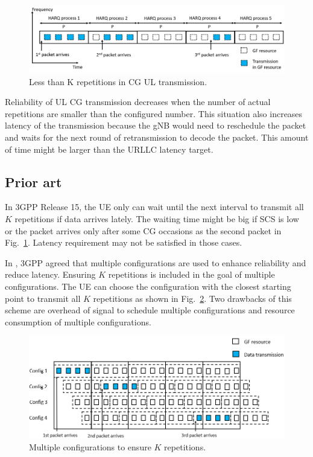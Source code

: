 \documentclass{ieeeaccess}
\begin{document}
\begin{figure}[htbp]
\centerline{\includegraphics[scale=0.27]{fig4.png}}
\caption{Less than K repetitions in CG UL transmission.}
\label{fig4}
\vspace{-3mm}
\end{figure}

Reliability of UL CG transmission decreases when the number of actual repetitions are smaller than the configured number. This situation also increases latency of the transmission because the gNB would need to reschedule the packet and waits for the next round of retransmission to decode the packet. This amount of time might be larger than the URLLC latency target.

\subsection{Prior art}\label{IIIBN}
In 3GPP Release 15, the UE only can wait until the next interval to transmit all $K$ repetitions if data arrives lately. The waiting time might be big if SCS is low or the packet arrives only after some CG occasions as the second packet in Fig.~\ref{fig4}. Latency requirement may not be satisfied in those cases.

In \cite{ref7}, 3GPP agreed that multiple configurations are used to enhance reliability and reduce latency. Ensuring $K$ repetitions is included in the goal of multiple configurations. The UE can choose the configuration with the closest starting point to transmit all $K$ repetitions as shown in Fig.~\ref{fig14}. Two drawbacks of this scheme are overhead of signal to schedule multiple configurations and resource consumption of multiple configurations.

\begin{figure}[htbp]
\centerline{\includegraphics[scale=0.4]{fig14.PNG}}
\caption{Multiple configurations to ensure $K$ repetitions.}
\label{fig14}
\vspace{-4mm}
\end{figure}
\end{document}
